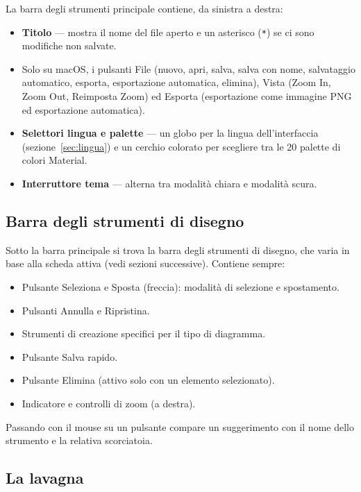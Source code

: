 \documentclass[a4paper,11pt]{article}
\newcommand\mediumweight{\fontseries{mb}\selectfont}
\newcommand\uielement[1]{{\mediumweight #1}}
\begin{document}
La barra degli strumenti principale contiene, da sinistra a destra:

\begin{itemize}
  \item \textbf{Titolo} --- mostra il nome del file aperto e un asterisco (\texttt{*}) se ci sono
        modifiche non salvate.
  \item Solo su macOS, i pulsanti \uielement{File} (nuovo, apri, salva, salva con nome,
        salvataggio automatico, esporta, esportazione automatica, elimina), \uielement{Vista}
        (Zoom In, Zoom Out, Reimposta Zoom) ed \uielement{Esporta} (esportazione come immagine
        PNG ed esportazione automatica).
  \item \textbf{Selettori lingua e palette} --- un globo per la lingua dell'interfaccia
        (sezione~\ref{sec:lingua}) e un cerchio colorato per scegliere tra le 20 palette di
        colori Material.
  \item \textbf{Interruttore tema} --- alterna tra modalità chiara e modalità scura.
\end{itemize}

\subsection{Barra degli strumenti di disegno}

Sotto la barra principale si trova la barra degli strumenti di disegno, che varia in base alla
scheda attiva (vedi sezioni successive). Contiene sempre:

\begin{itemize}
  \item Pulsante \uielement{Seleziona e Sposta} (freccia): modalità di selezione e spostamento.
  \item Pulsanti \uielement{Annulla} e \uielement{Ripristina}.
  \item Strumenti di creazione specifici per il tipo di diagramma.
  \item Pulsante \uielement{Salva} rapido.
  \item Pulsante \uielement{Elimina} (attivo solo con un elemento selezionato).
  \item Indicatore e controlli di zoom (a destra).
\end{itemize}

Passando con il mouse su un pulsante compare un suggerimento con il nome dello strumento e la
relativa scorciatoia.

\subsection{La lavagna}
\end{document}
